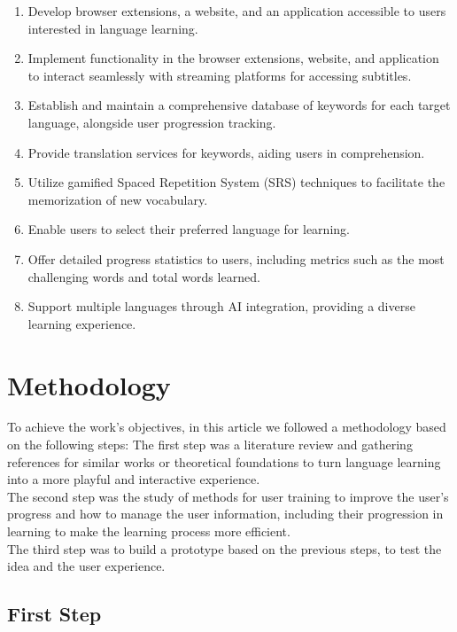 \documentclass[12pt]{article}
\begin{document}
\begin{enumerate}
\item Develop browser extensions, a website, and an application accessible to users interested in language learning.
\item Implement functionality in the browser extensions, website, and application to interact seamlessly with streaming platforms for accessing subtitles.
\item Establish and maintain a comprehensive database of keywords for each target language, alongside user progression tracking.
\item Provide translation services for keywords, aiding users in comprehension.
\item Utilize gamified Spaced Repetition System (SRS) techniques to facilitate the memorization of new vocabulary.
\item Enable users to select their preferred language for learning.
\item Offer detailed progress statistics to users, including metrics such as the most challenging words and total words learned.
\item Support multiple languages through AI integration, providing a diverse learning experience.
\end{enumerate}


\section{Methodology}
To achieve the work's objectives, in this article we followed a methodology based on the following steps:
The first step was a literature review and gathering references for similar works or theoretical foundations to turn language learning into a more playful and interactive experience. \\
The second step was the study of methods for user training to improve the user's progress and how to manage the user information, including their progression in learning to make the learning process more efficient. \\
The third step was to build a prototype based on the previous steps, to test the idea and the user experience. \\
\subsection{First Step}
\end{document}
